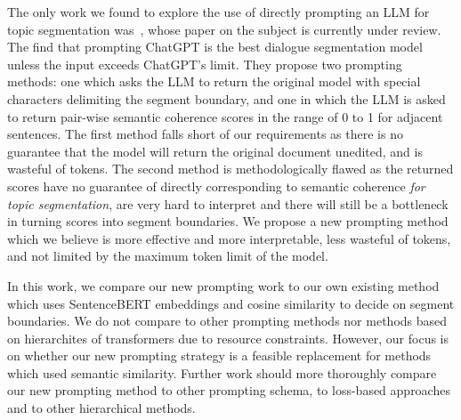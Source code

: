 The only work we found to explore the use of directly prompting an LLM for topic segmentation was~\citep{XingThesis}, whose paper on the subject is currently under review. The find that prompting ChatGPT is the best dialogue segmentation model unless the input exceeds ChatGPT's limit. They propose two prompting methods: one which asks the LLM to return the original model with special characters delimiting the segment boundary, and one in which the LLM is asked to return pair-wise semantic coherence scores in the range of 0 to 1 for adjacent sentences. The first method falls short of our requirements as there is no guarantee that the model will return the original document unedited, and is wasteful of tokens. The second method is methodologically flawed as the returned scores have no guarantee of directly corresponding to semantic coherence \emph{for topic segmentation}, are very hard to interpret and there will still be a bottleneck in turning scores into segment boundaries. We propose a new prompting method which we believe is more effective and more interpretable, less wasteful of tokens, and not limited by the maximum token limit of the model.

In this work, we compare our new prompting work to our own existing method which uses SentenceBERT embeddings and cosine similarity to decide on segment boundaries. We do not compare to other prompting methods nor methods based on hierarchites of transformers due to resource constraints. However, our focus is on whether our new prompting strategy is a feasible replacement for methods which used semantic similarity. Further work should more thoroughly compare our new prompting method to other prompting schema, to loss-based approaches and to other hierarchical methods.
